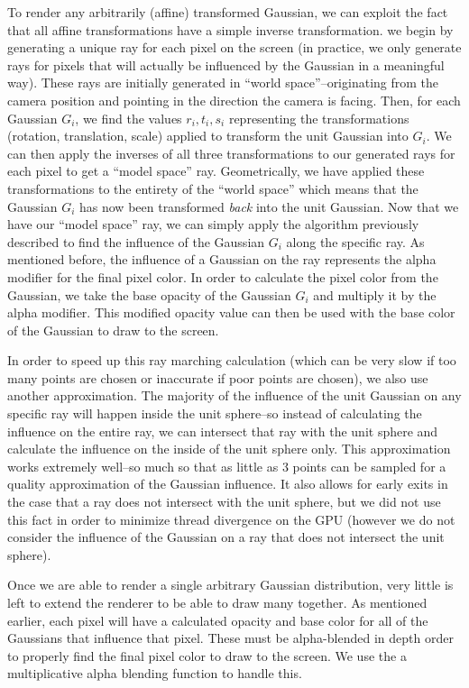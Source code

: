 \documentclass[12pt, a4paper, twocolumn]{article}
\begin{document}
To render any arbitrarily (affine) transformed Gaussian, we can exploit the fact that all affine transformations have a simple inverse transformation. we begin by generating a unique ray for each pixel on the screen (in practice, we only generate rays for pixels that will actually be influenced by the Gaussian in a meaningful way). These rays are initially generated in ``world space''--originating from the camera position and pointing in the direction the camera is facing. Then, for each Gaussian $G_i$, we find the values $r_i, t_i, s_i$ representing the transformations (rotation, translation, scale) applied to transform the unit Gaussian into $G_i$. We can then apply the inverses of all three transformations to our generated rays for each pixel to get a ``model space'' ray. Geometrically, we have applied these transformations to the entirety of the ``world space'' which means that the Gaussian $G_i$ has now been transformed \textit{back} into the unit Gaussian. Now that we have our ``model space'' ray, we can simply apply the algorithm previously described to find the influence of the Gaussian $G_i$ along the specific ray. As mentioned before, the influence of a Gaussian on the ray represents the alpha modifier for the final pixel color. In order to calculate the pixel color from the Gaussian, we take the base opacity of the Gaussian $G_i$ and multiply it by the alpha modifier. This modified opacity value can then be used with the base color of the Gaussian to draw to the screen.

In order to speed up this ray marching calculation (which can be very slow if too many points are chosen or inaccurate if poor points are chosen), we also use another approximation. The majority of the influence of the unit Gaussian on any specific ray will happen inside the unit sphere--so instead of calculating the influence on the entire ray, we can intersect that ray with the unit sphere and calculate the influence on the inside of the unit sphere only. This approximation works extremely well--so much so that as little as 3 points can be sampled for a quality approximation of the Gaussian influence. It also allows for early exits in the case that a ray does not intersect with the unit sphere, but we did not use this fact in order to minimize thread divergence on the GPU (however we do not consider the influence of the Gaussian on a ray that does not intersect the unit sphere).

Once we are able to render a single arbitrary Gaussian distribution, very little is left to extend the renderer to be able to draw many together. As mentioned earlier, each pixel will have a calculated opacity and base color for all of the Gaussians that influence that pixel. These must be alpha-blended in depth order to properly find the final pixel color to draw to the screen. We use the a multiplicative alpha blending function to handle this.  
\end{document}

